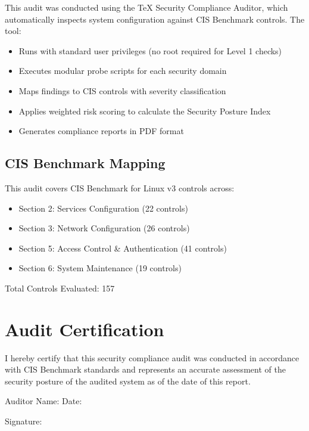 \documentclass[12pt,a4paper]{article}
\begin{document}
This audit was conducted using the TeX Security Compliance Auditor, which automatically inspects system configuration against CIS Benchmark controls. The tool:

\begin{itemize}
\item Runs with standard user privileges (no root required for Level 1 checks)
\item Executes modular probe scripts for each security domain
\item Maps findings to CIS controls with severity classification
\item Applies weighted risk scoring to calculate the Security Posture Index
\item Generates compliance reports in PDF format
\end{itemize}

\subsection*{CIS Benchmark Mapping}

This audit covers CIS Benchmark for Linux v3 controls across:
\begin{itemize}
\item Section 2: Services Configuration (22 controls)
\item Section 3: Network Configuration (26 controls)
\item Section 5: Access Control \& Authentication (41 controls)
\item Section 6: System Maintenance (19 controls)
\end{itemize}

Total Controls Evaluated: 157

\newpage

\section*{Audit Certification}

I hereby certify that this security compliance audit was conducted in accordance with CIS Benchmark standards and represents an accurate assessment of the security posture of the audited system as of the date of this report.

\vspace{2cm}

\noindent
Auditor Name: \underline{\hspace{5cm}} Date: \underline{\hspace{2cm}}

\noindent
Signature: \underline{\hspace{8cm}}
\end{document}
